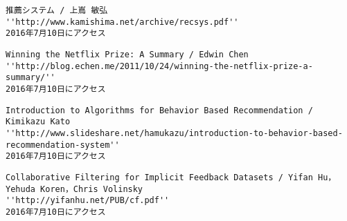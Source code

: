 \documentclass[a4j,titlepage]{jarticle}
\begin{document}
\newpage
\begin{thebibliography}{num=9}
 \begin{verbatim}
推薦システム / 上嶌 敏弘
''http://www.kamishima.net/archive/recsys.pdf''
2016年7月10日にアクセス
\end{verbatim}
 \begin{verbatim}
Winning the Netflix Prize: A Summary / Edwin Chen
''http://blog.echen.me/2011/10/24/winning-the-netflix-prize-a-summary/''
2016年7月10日にアクセス
\end{verbatim}
 \begin{verbatim}
Introduction to Algorithms for Behavior Based Recommendation / Kimikazu Kato
''http://www.slideshare.net/hamukazu/introduction-to-behavior-based-
recommendation-system''
2016年7月10日にアクセス
\end{verbatim}
 \begin{verbatim}
Collaborative Filtering for Implicit Feedback Datasets / Yifan Hu，Yehuda Koren，Chris Volinsky
''http://yifanhu.net/PUB/cf.pdf''
2016年7月10日にアクセス
\end{verbatim}
\end{thebibliography}
\end{document}
